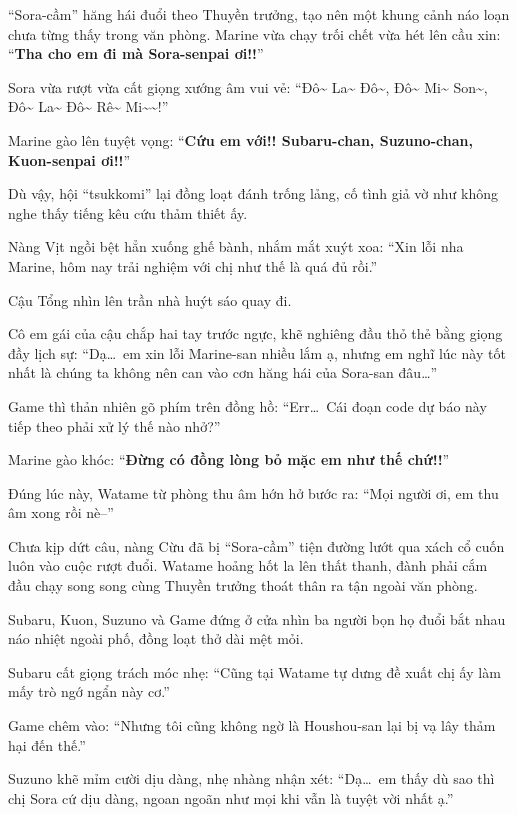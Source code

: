 \documentclass[../main.tex]{subfiles}
\begin{document}

``Sora-cầm'' hăng hái đuổi theo Thuyền trưởng, tạo nên một khung cảnh náo loạn chưa từng thấy trong văn phòng. Marine vừa chạy trối chết vừa hét lên cầu xin: ``\textbf{Tha cho em đi mà Sora-senpai ơi!!}''

Sora vừa rượt vừa cất giọng xướng âm vui vẻ: ``Đô\~{} La\~{} Đô\~{}, Đô\~{} Mi\~{} Son\~{}, Đô\~{} La\~{} Đô\~{} Rê\~{} Mi\~{}\~{}!''

Marine gào lên tuyệt vọng: ``\textbf{Cứu em với!! Subaru-chan, Suzuno-chan, Kuon-senpai ơi!!}''

Dù vậy, hội ``tsukkomi'' lại đồng loạt đánh trống lảng, cố tình giả vờ như không nghe thấy tiếng kêu cứu thảm thiết ấy.

Nàng Vịt ngồi bệt hẳn xuống ghế bành, nhắm mắt xuýt xoa: ``Xin lỗi nha Marine, hôm nay trải nghiệm với chị như thế là quá đủ rồi.''

Cậu Tổng nhìn lên trần nhà huýt sáo quay đi.

Cô em gái của cậu chắp hai tay trước ngực, khẽ nghiêng đầu thỏ thẻ bằng giọng đầy lịch sự: ``Dạ\dots\ em xin lỗi Marine-san nhiều lắm ạ, nhưng em nghĩ lúc này tốt nhất là chúng ta không nên can vào cơn hăng hái của Sora-san đâu\dots''

Game thì thản nhiên gõ phím trên đồng hồ: ``Err\dots\ Cái đoạn code dự báo này tiếp theo phải xử lý thế nào nhở?''

Marine gào khóc: ``\textbf{Đừng có đồng lòng bỏ mặc em như thế chứ!!}''

Đúng lúc này, Watame từ phòng thu âm hớn hở bước ra: ``Mọi người ơi, em thu âm xong rồi nè--''

Chưa kịp dứt câu, nàng Cừu đã bị ``Sora-cầm'' tiện đường lướt qua xách cổ cuốn luôn vào cuộc rượt đuổi. Watame hoảng hốt la lên thất thanh, đành phải cắm đầu chạy song song cùng Thuyền trưởng thoát thân ra tận ngoài văn phòng.

Subaru, Kuon, Suzuno và Game đứng ở cửa nhìn ba người bọn họ đuổi bắt nhau náo nhiệt ngoài phố, đồng loạt thở dài mệt mỏi.

Subaru cất giọng trách móc nhẹ: ``Cũng tại Watame tự dưng đề xuất chị ấy làm mấy trò ngớ ngẩn này cơ.''

Game chêm vào: ``Nhưng tôi cũng không ngờ là Houshou-san lại bị vạ lây thảm hại đến thế.''

Suzuno khẽ mỉm cười dịu dàng, nhẹ nhàng nhận xét: ``Dạ\dots\ em thấy dù sao thì chị Sora cứ dịu dàng, ngoan ngoãn như mọi khi vẫn là tuyệt vời nhất ạ.''
\end{document}
